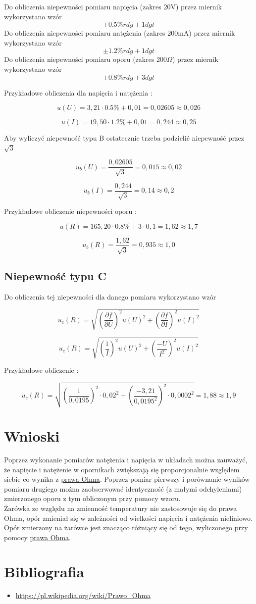 \documentclass[12pt]{article}
\begin{document}
Do obliczenia niepewności pomiaru napięcia (zakres 20V) przez miernik wykorzystano wzór
$$ \pm 0.5\% rdg + 1dgt  $$
Do obliczenia niepewności pomiaru natężenia (zakres 200mA) przez miernik wykorzystano wzór
$$ \pm 1.2\% rdg + 1dgt  $$
Do obliczenia niepewności pomiaru oporu (zakres 200$\Omega$) przez miernik wykorzystano wzór
$$ \pm 0.8\% rdg + 3dgt  $$

Przykładowe obliczenia dla napięcia i natężenia :

$$ u(U) = 3,21 \cdot 0.5\% + 0,01 = 0,02605 \approx 0,026 $$

$$ u(I) = 19,50 \cdot 1.2\% + 0,01 = 0,244 \approx 0,25 $$

Aby wyliczyć niepewność typu B ostatecznie trzeba podzielić niepewność przez $ \sqrt{3} $

$$ u_b(U) = \frac{0,02605}{\sqrt{3}} = 0,015 \approx 0,02 $$

$$ u_b(I) = \frac{0,244}{\sqrt{3}} = 0,14 \approx 0,2 $$

Przykładowe obliczenie niepewności oporu :

$$ u(R) = 165,20 \cdot 0.8\% + 3 \cdot 0,1 = 1,62 \approx 1,7 $$

$$ u_b(R) = \frac{1,62}{\sqrt{3}} = 0,935 \approx 1,0 $$

\subsection{Niepewność typu C}

Do obliczenia tej niepewności dla danego pomiaru wykorzystano wzór

$$ u_c(R) = \sqrt{(\frac{\partial f}{\partial U})^2 u(U)^2 + (\frac{\partial f}{\partial I})^2 u(I)^2 } $$

$$ u_c(R) = \sqrt{(\frac{1}{I})^2 u(U)^2 + (\frac{-U}{I^2})^2 u(I)^2 } $$

Przykładowe obliczenie :

$$ u_c(R) = \sqrt{(\frac{1}{0,0195})^2 \cdot 0,02^2 + (\frac{-3,21}{0,0195^2})^2 \cdot 0,0002^2} = 1,88 \approx 1,9 $$

\section{Wnioski}
Poprzez wykonanie pomiarów natężenia i napięcia w układach można zauważyć, że napięcie i natężenie
w opornikach
zwiększają się proporcjonalnie względem siebie co wynika z \hyperlink{ohm}{prawa Ohma}. Poprzez
pomiar pierwszy i porównanie wyników pomiaru drugiego można zaobserwować identyczność (z małymi
odchyleniami) zmierzonego oporu z tym obliczonym przy pomocy wzoru. \\
Żarówka ze względu na zmienność temperatury nie zastosowuje się do prawa Ohma, opór zmieniał się 
w zależności od wielkości napięcia i natężenia nieliniowo. Opór zmierzony na żarówce jest znacząco
różniący się od tego, wyliczonego przy pomocy \hyperlink{ohm}{prawa Ohma}.

\section{Bibliografia}
\begin{itemize}
    \item \url{https://pl.wikipedia.org/wiki/Prawo_Ohma}
\end{itemize}
\end{document}
